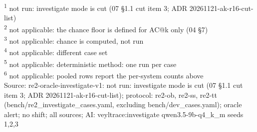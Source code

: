 \begin{table}[t]
\begin{tabular}{lllllllllllllllllllll}
\hline
\end{tabular}
\par\smallskip\footnotesize
\textsuperscript{1} not run: investigate mode is cut (07 \S{}1.1 cut item 3; ADR 20261121-ak-r16-cut-list)\\
\textsuperscript{2} not applicable: the chance floor is defined for AC@k only (04 \S{}7)\\
\textsuperscript{3} not applicable: chance is computed, not run\\
\textsuperscript{4} not applicable: different case set\\
\textsuperscript{5} not applicable: deterministic method: one run per case\\
\textsuperscript{6} not applicable: pooled rows report the per-system counts above\\
Source: re2-oracle-investigate-v1: not run: investigate mode is cut (07 \S{}1.1 cut item 3; ADR 20261121-ak-r16-cut-list); protocol: re2-ob, re2-ss, re2-tt (bench/re2\_investigate\_cases.yaml, excluding bench/dev\_cases.yaml); oracle alert; no shift; all sources; AI: veyltrace:investigate qwen3.5-9b-q4\_k\_m seeds 1,2,3\\
\end{table}
